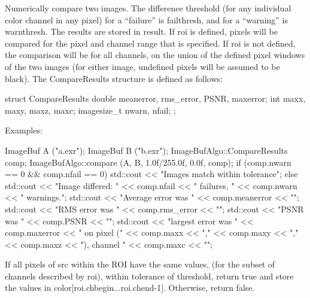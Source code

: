  

Numerically compare two images.  The difference threshold (for any
individual color channel in any pixel) for a ``failure'' is
{\cf failthresh}, and for a ``warning'' is {\cf warnthresh}.  The 
results are stored in {\cf result}.  If {\cf roi} is defined, pixels
will be compared for the pixel and channel range that is specified.  If
{\cf roi} is not defined, the comparison will be for all channels, on
the union of the defined pixel windows of the two images (for either
image, undefined pixels will be assumed to be black).  The 
{\cf CompareResults} structure is defined as follows:
\begin{code}
struct CompareResults {
    double meanerror, rms_error, PSNR, maxerror;
    int maxx, maxy, maxz, maxc;
    imagesize_t nwarn, nfail;
};
\end{code}

\smallskip
\noindent Examples:
\begin{code}
    ImageBuf A ("a.exr");
    ImageBuf B ("b.exr");
    ImageBufAlgo::CompareResults comp;
    ImageBufAlgo::compare (A, B, 1.0f/255.0f, 0.0f, comp);
    if (comp.nwarn == 0 && comp.nfail == 0) {
        std::cout << "Images match within tolerance\n";
    } else {
        std::cout << "Image differed: " << comp.nfail << " failures, "
                  << comp.nwarn << " warnings.\n";
        std::cout << "Average error was " << comp.meanerror << "\n";
        std::cout << "RMS error was " << comp.rms_error << "\n";
        std::cout << "PSNR was " << comp.PSNR << "\n";
        std::cout << "largest error was " << comp.maxerror 
                  << " on pixel (" << comp.maxx << "," << comp.maxy 
                  << "," << comp.maxz << "), channel " << comp.maxc << "\n";
    }
\end{code}
\apiend


 

If all pixels of {\cf src} within the ROI have the same values, (for the
subset of channels described by {\cf roi}), within
tolerance of {\cf threshold}, return {\cf true} and store
the values in {\cf color[roi.chbegin...roi.chend-1]}.  Otherwise, return
{\cf false}.

